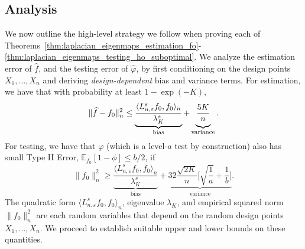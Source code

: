 \documentclass{article}
\newcommand{\1}{\mathbf{1}}
\newcommand{\Ebb}{\mathbb{E}}
\newcommand{\dotp}[2]{\langle #1, #2 \rangle}
\newcommand{\wh}[1]{\widehat{#1}}
\theoremstyle{alden}
\theoremstyle{aldenthm}
\theoremstyle{definition}
\theoremstyle{remark}
\begin{document}
\subsection{Analysis}
\label{subsec:analysis}

We now outline the high-level strategy we follow when proving each of Theorems~\ref{thm:laplacian_eigenmaps_estimation_fo}-\ref{thm:laplacian_eigenmaps_testing_ho_suboptimal}. We analyze the estimation error of $\wh{f}$, and the testing error of $\wh{\varphi}$, by first conditioning on the design points $X_1,\ldots,X_n$ and deriving \emph{design-dependent} bias and variance terms. For estimation, we have that with probability at least $1 - \exp(-K)$,
\begin{equation}
\label{eqn:estimation_biasvariance}
\|\wh{f} - f_0\|_n^2 \leq \underbrace{\frac{\dotp{L_{n,\varepsilon}^s f_0}{f_0}_n}{\lambda_{K}^s}}_{\textrm{bias}} + \underbrace{\frac{5K}{n} \vphantom{\frac{\dotp{L^s f_0}{f_0}_n}{\lambda_{K}^s}}}_{\textrm{variance}}.
\end{equation}
For testing, we have that $\varphi$ (which is a level-$a$ test by construction) also has small Type II Error, $\Ebb_{f_0}[1 - \phi] \leq b/2$, if 
\begin{equation}
\label{eqn:testing_biasvariance}
\|f_0\|_n^2 \geq  \underbrace{\frac{\dotp{L_{n,\varepsilon}^s f_0}{f_0}_n}{\lambda_{K}^s}}_{\textrm{bias}} + \underbrace{32\frac{\sqrt{2K}}{n}\biggl[\sqrt{\frac{1}{a}} + \frac{1}{b}\biggr]}_{\textrm{variance}}.
\end{equation}
The quadratic form $\dotp{L_{n,\varepsilon}^s f_0}{f_0}_n$, eigenvalue $\lambda_{K}$, and empirical squared norm $\|f_0\|_n^2$ are each random variables that depend on the random design points $X_1,\ldots,X_n$. We proceed to establish suitable upper and lower bounds on these quantities. 
\end{document}
